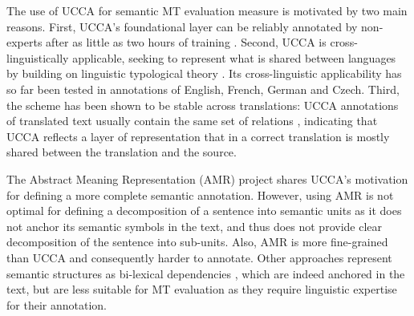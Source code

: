 \documentclass[11pt,letterpaper]{article}
\newcommand{\oa}[1]{\footnote{\color{red}OA: #1}}
\def\parcite#1{\cite{#1}}
\begin{document}
The use of UCCA for semantic MT evaluation measure is motivated by two main reasons. 
First, UCCA's foundational layer can
be reliably annotated by non-experts after as little as two hours
of training \parcite{marinotti2014}.
Second, UCCA is cross-linguistically applicable, seeking to
represent what is shared between languages by building on
linguistic typological theory \parcite{Dixon:10a,Dixon:10b,Dixon:12}.
Its cross-linguistic applicability has so far been tested in annotations of
English, French, German and Czech.
Third, the scheme has been shown to be stable across translations:
UCCA annotations of translated text usually contain the same set of relations
\parcite{sulem2015conceptual}, indicating that UCCA reflects a layer of
representation that in a correct translation is mostly shared between
the translation and the source.



The Abstract Meaning Representation (AMR) \parcite{banarescu2013abstract} project
shares UCCA's motivation for defining a more complete semantic annotation.
However, using AMR is not optimal for defining a decomposition of a sentence into semantic
units as it does not anchor its semantic symbols in the text,
and thus does not provide clear decomposition of the sentence into sub-units.
Also, AMR is more fine-grained than UCCA and consequently harder to annotate.
Other approaches represent semantic structures as bi-lexical dependencies
\parcite{sgallhp:1986,hajic2012announcing,oepen2006discriminant},
which are indeed anchored in the text, but are less suitable for MT evaluation
as they require linguistic expertise for their annotation.
\end{document}
